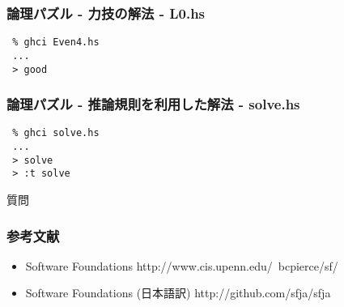 \documentclass[cjk,dvipdfm,14pt]{beamer}
\begin{document}
\begin{frame}[fragile]
\frametitle{論理パズル - 力技の解法 - L0.hs}

\begin{lstlisting}
 % ghci Even4.hs
 ...
 > good
\end{lstlisting}

\end{frame}

\begin{frame}[fragile]
\frametitle{論理パズル - 推論規則を利用した解法 - solve.hs}

\begin{lstlisting}
 % ghci solve.hs
 ...
 > solve
 > :t solve
\end{lstlisting}

\end{frame}

\begin{frame}[fragile]
質問
\end{frame}

\begin{frame}[fragile]
\frametitle{参考文献}

\begin{itemize}
\item Software Foundations http://www.cis.upenn.edu/~bcpierce/sf/
\item Software Foundations (日本語訳) http://github.com/sfja/sfja
\end{itemize}

\end{frame}


\end{document}
